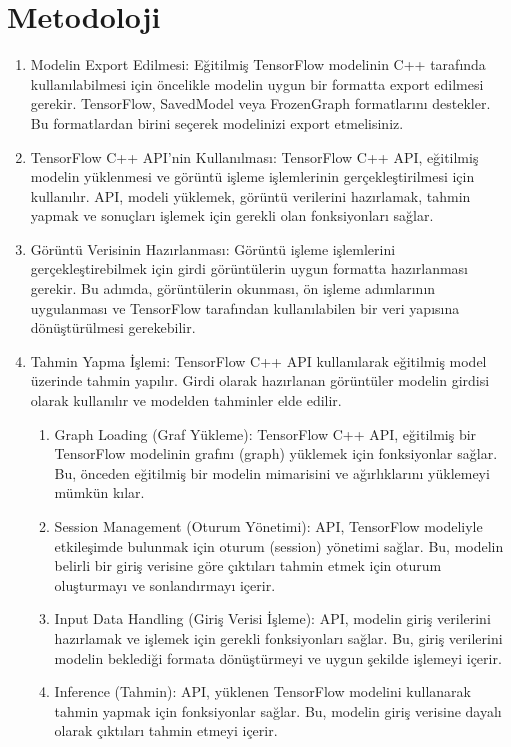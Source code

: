 \documentclass[12pt,a4paper]{article}
\begin{document}
		\section{Metodoloji}
		\begin{enumerate}
			\item Modelin Export Edilmesi: Eğitilmiş TensorFlow modelinin C++ tarafında kullanılabilmesi için öncelikle modelin uygun bir formatta export edilmesi gerekir. TensorFlow, SavedModel veya FrozenGraph formatlarını destekler. Bu formatlardan birini seçerek modelinizi export etmelisiniz.
			\item TensorFlow C++ API'nin Kullanılması: TensorFlow C++ API, eğitilmiş modelin yüklenmesi ve görüntü işleme işlemlerinin gerçekleştirilmesi için kullanılır. API, modeli yüklemek, görüntü verilerini hazırlamak, tahmin yapmak ve sonuçları işlemek için gerekli olan fonksiyonları sağlar.
			\item 	Görüntü Verisinin Hazırlanması: Görüntü işleme işlemlerini gerçekleştirebilmek için girdi görüntülerin uygun formatta hazırlanması gerekir. Bu adımda, görüntülerin okunması, ön işleme adımlarının uygulanması ve TensorFlow tarafından kullanılabilen bir veri yapısına dönüştürülmesi gerekebilir.
			\item  Tahmin Yapma İşlemi: TensorFlow C++ API kullanılarak eğitilmiş model üzerinde tahmin yapılır. Girdi olarak hazırlanan görüntüler modelin girdisi olarak kullanılır ve modelden tahminler elde edilir.
			\begin{enumerate}
				\section*{TensorFlowlite C++ API Neleri İçerir}
				\item Graph Loading (Graf Yükleme): TensorFlow C++ API, eğitilmiş bir TensorFlow modelinin grafını (graph) yüklemek için fonksiyonlar sağlar. Bu, önceden eğitilmiş bir modelin mimarisini ve ağırlıklarını yüklemeyi mümkün kılar.
				\item Session Management (Oturum Yönetimi): API, TensorFlow modeliyle etkileşimde bulunmak için oturum (session) yönetimi sağlar. Bu, modelin belirli bir giriş verisine göre çıktıları tahmin etmek için oturum oluşturmayı ve sonlandırmayı içerir.
				\item Input Data Handling (Giriş Verisi İşleme): API, modelin giriş verilerini hazırlamak ve işlemek için gerekli fonksiyonları sağlar. Bu, giriş verilerini modelin beklediği formata dönüştürmeyi ve uygun şekilde işlemeyi içerir.
				\item Inference (Tahmin): API, yüklenen TensorFlow modelini kullanarak tahmin yapmak için fonksiyonlar sağlar. Bu, modelin giriş verisine dayalı olarak çıktıları tahmin etmeyi içerir.
		

\end{enumerate}
\end{enumerate}
\end{document}
